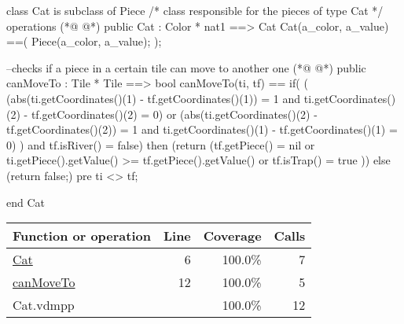 \begin{vdmpp}[breaklines=true]
class Cat is subclass of Piece
/*
class responsible for the pieces of type Cat
*/
operations
(*@
\label{Cat:6}
@*)
 public Cat : Color * nat1 ==> Cat
  Cat(a_color, a_value) ==(
   Piece(a_color, a_value);
  );
   
 --checks if a piece in a certain tile can move to another one
(*@
\label{canMoveTo:12}
@*)
 public canMoveTo : Tile * Tile  ==> bool
 canMoveTo(ti, tf) 
  ==  if(
       (
       (abs(ti.getCoordinates()(1) - tf.getCoordinates()(1)) = 1 and ti.getCoordinates()(2) - tf.getCoordinates()(2) = 0) or 
       (abs(ti.getCoordinates()(2) - tf.getCoordinates()(2)) = 1 and ti.getCoordinates()(1) - tf.getCoordinates()(1) = 0)
       ) 
      and tf.isRiver() = false)
       then (return (tf.getPiece() = nil or ti.getPiece().getValue() >= tf.getPiece().getValue() or tf.isTrap() = true )) 
    else (return false;)
 pre ti <> tf;
 
end Cat
\end{vdmpp}
\bigskip
\begin{longtable}{|l|r|r|r|}
\hline
Function or operation & Line & Coverage & Calls \\
\hline
\hline
\hyperref[Cat:6]{Cat} & 6&100.0\% & 7 \\
\hline
\hyperref[canMoveTo:12]{canMoveTo} & 12&100.0\% & 5 \\
\hline
\hline
Cat.vdmpp & & 100.0\% & 12 \\
\hline
\end{longtable}


